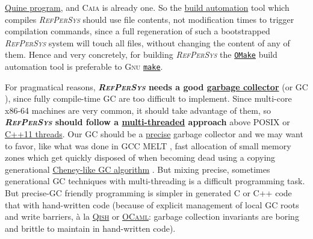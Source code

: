 \documentclass[11pt,a4paper,svgnames]{article}
\newcommand{\RefPerSys}{{\textit{\textsc{RefPerSys}}}}
\begin{document}
\href{https://en.wikipedia.org/wiki/Quine\_(computing)}{Quine
  program}, and \textsc{Caia} is already one. So the
\href{https://en.wikipedia.org/wiki/Build\_automation}{build
  automation} tool which compiles {\RefPerSys} should use file
contents, not modification times to trigger compilation commands,
since a full regeneration of such a bootstrapped {\RefPerSys} system
will touch all files, without changing the content of any of
them. Hence and very concretely, for building {\RefPerSys} the
\href{http://projects.camlcity.org/projects/omake.html}{\texttt{OMake}}
build automation tool is preferable to \textsc{Gnu}
\href{https://www.gnu.org/software/make/}{\texttt{make}}.

For pragmatical reasons, \textbf{{\RefPerSys} needs a good
  \href{https://en.wikipedia.org/wiki/Tracing\_garbage\_collection}{garbage
    collector}} (or GC \cite{appel:1991:garbage,
  wilson:1992:uniprocessorgc, baker:1995:cons,
  jones:2016:gchandbook}), since fully compile-time GC
\cite{mazur:2004:compile} are too difficult to implement. Since
multi-core x86-64 machines are very common, it should take advantage
of them, so \textbf{{\RefPerSys} should follow a
  \href{https://en.wikipedia.org/wiki/Thread_(computing)}{multi-threaded}
  approach} above \textsc{POSIX} \cite{barney:2010:pthreads} or
\href{https://en.cppreference.com/w/cpp/thread}{C++11 threads}. Our GC
should be a
\href{https://en.wikipedia.org/wiki/Tracing_garbage_collection#Precise_vs._conservative_and_internal_pointers}{precise}
garbage collector \cite{Rafkind:2009:PreciseGC} and we may want to
favor, like what was done in \textsc{GCC MELT}
\cite{Starynkevitch:2007:Multistage, Starynkevitch-DSL2011,
  Starynkevitch-GCCMELTweb}, fast allocation of small memory zones
which get quickly disposed of when becoming dead using a copying
generational
\href{https://en.wikipedia.org/wiki/Cheney's\_algorithm}{Cheney-like
  GC algorithm} \cite{wilson:1992:uniprocessorgc}.  But mixing
precise, sometimes generational GC techniques with multi-threading is
a difficult programming task. But precise-GC friendly programming is
simpler in generated C or C++ code that with hand-written code
(because of explicit management of local GC roots and write barriers,
à la
\href{http://starynkevitch.net/Basile/qishintro.html}{\textsc{Qish}}
or
\href{https://caml.inria.fr/pub/docs/manual-ocaml/intfc.html}{\textsc{OCaml}}:
garbage collection invariants are boring and brittle to maintain in
hand-written code).
\end{document}
